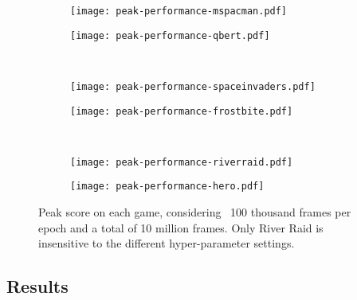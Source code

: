 \documentclass{article}
\begin{document}
\begin{figure}[htb]
    \centering
    \begin{subfigure}{.49\textwidth}
        \centering
        \texttt{[image: peak-performance-mspacman.pdf]}
        \label{fig:peak-mspacman}
    \end{subfigure}
    \begin{subfigure}{.49\textwidth}
        \centering
        \texttt{[image: peak-performance-qbert.pdf]}
        \label{fig:peak-qbert}
    \end{subfigure}\\[-6.4ex]
    \begin{subfigure}{.49\textwidth}
        \centering
        \texttt{[image: peak-performance-spaceinvaders.pdf]}
        \label{fig:peak-spaceinvaders}
    \end{subfigure}
    \begin{subfigure}{.49\textwidth}
        \centering
        \texttt{[image: peak-performance-frostbite.pdf]}
        \label{fig:peak-frostbite}
    \end{subfigure}\\[-6.4ex]
    \begin{subfigure}{.49\textwidth}
        \centering
        \texttt{[image: peak-performance-riverraid.pdf]}
        \label{fig:peak-riverraid}
    \end{subfigure}
    \begin{subfigure}{.49\textwidth}
        \centering
        \texttt{[image: peak-performance-hero.pdf]}
        \label{fig:peak-hero}
    \end{subfigure}\vspace{-1.5\baselineskip}
    
    \caption{Peak score on each game, considering ~100 thousand frames per epoch and a total of 10 million frames. Only River Raid is insensitive to the different hyper-parameter settings.}
    \label{fig:peak}
\end{figure}

\subsection{Results}
\end{document}
